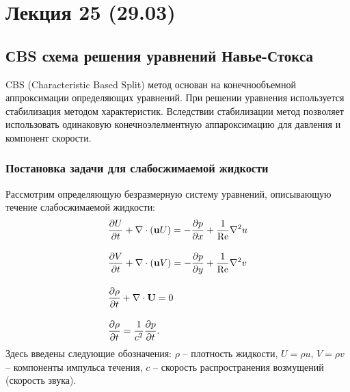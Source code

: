 \section{Лекция 25 (29.03)}

\subsection{СBS схема решения уравнений Навье-Стокса}
CBS (Characteristic Based Split)
метод основан на конечнообъемной аппроксимации определяющих уравнений.
При решении уравнения используется стабилизация методом характеристик.
Вследствии стабилизации метод позволяет использовать одинаковую конечноэлелментную
аппароксимацию для давления и компонент скорости.

\subsubsection{Постановка задачи для слабосжимаемой жидкости}
Рассмотрим определяющую безразмерную систему уравнений, описывающую
течение слабосжимаемой жидкости:
\begin{align}
\label{eq:cbs_u}
&\frac{\partial U}{\partial t} + \nabla\cdot(\boldsymbol{\rm u} U) = -\frac{\partial p}{\partial x} + \frac{1}{\mathrm{Re}}\nabla^2 u \\[10pt]
\label{eq:cbs_v}
&\frac{\partial V}{\partial t} + \nabla\cdot(\boldsymbol{\rm u} V) = -\frac{\partial p}{\partial y} + \frac{1}{\mathrm{Re}}\nabla^2 v \\[10pt]
\label{eq:cbs_rho}
&\frac{\partial \rho}{\partial t} + \nabla\cdot\boldsymbol{\rm U} = 0 \\[10pt]
\label{eq:cbs_rho_p}
&\frac{\partial \rho}{\partial t} = \frac{1}{c^2}\frac{\partial p}{\partial t}.
\end{align}
Здесь введены следующие обозначения:
$\rho$ -- плотность жидкости,
$U = \rho u$, $V = \rho v$ -- компоненты импульса течения,
$c$ -- скорость распространения возмущений (скорость звука).


